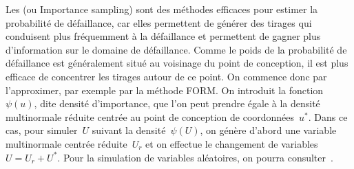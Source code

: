 Les  (ou Importance sampling) sont des méthodes efficaces pour estimer la probabilité de défaillance, car elles permettent de générer des tirages qui conduisent plus fréquemment à la défaillance et permettent de gagner plus d'information sur le domaine de défaillance.
Comme le poids de la probabilité de défaillance est généralement situé au voisinage du point de conception, il est plus efficace de concentrer les tirages autour de ce point. On commence donc par l'approximer, par exemple par la méthode FORM. On introduit la fonction~$\psi(u)$, dite densité d'importance, que l'on peut prendre égale à la densité multinormale réduite centrée au point de conception de coordonnées~$u^*$. Dans ce cas, pour simuler~$U$ suivant la densité~$\psi(U)$, on génère d'abord une variable multinormale centrée réduite~$U_r$ et on effectue le changement de variables~$U=U_r+U^*$. Pour la simulation de variables aléatoires, on pourra consulter~\cite{bib-Krikorian}.


